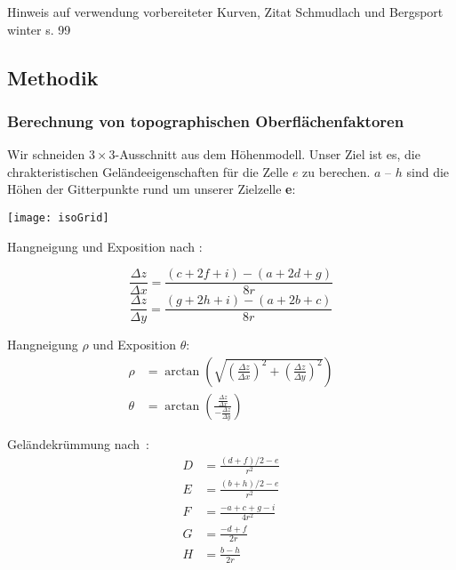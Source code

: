 Hinweis auf verwendung vorbereiteter Kurven, Zitat Schmudlach und Bergsport winter s. 99

\subsection{Methodik}
\subsubsection{Berechnung von topographischen Oberflächenfaktoren}

Wir schneiden $3 \times 3$-Ausschnitt aus dem Höhenmodell. Unser Ziel ist es, die chrakteristischen Geländeeigenschaften für die Zelle $e$ zu berechen.
$a$ -- $h$ sind die Höhen der Gitterpunkte rund um unserer Zielzelle \textbf{e}:

\begin{Figure}
  \centering
  \texttt{[image: isoGrid]}
\end{Figure}

Hangneigung und Exposition nach \cite{gisslopeaspect}:

\begin{equation} \label{eq1}
  \frac{\Delta z}{\Delta x} = \frac{(c + 2f + i) - (a + 2d + g)}{8r}
\end{equation}
\begin{equation} \label{eq2}
  \frac{\Delta z}{\Delta y} = \frac{(g + 2h + i) - (a + 2b + c)}{8r}
\end{equation}

Hangneigung $\rho$ und Exposition $\theta$:
\begin{align}
  \rho &= \arctan \left( \sqrt{
    {\left( \frac{\Delta z}{\Delta x}\right)}^2 + 
    {\left(\frac{\Delta z}{\Delta y}\right)}^2}
  \right)\\
  \theta &= \arctan\left(\frac{\frac{\Delta z}{\Delta x}}{-\frac{\Delta z}{\Delta y}}\right)
\end{align}

Geländekrümmung nach~\cite{gismath}:
\begin{align}
  D &= \frac{{(d + f) / 2 - e}}{{r^2}} \\
  E &= \frac{{(b + h) / 2 - e}}{{r^2}} \\
  F &= \frac{{-a + c + g - i}}{{4r^2}} \\
  G &= \frac{{-d + f}}{{2r}} \\
  H &= \frac{{b - h}}{{2r}}
\end{align}

